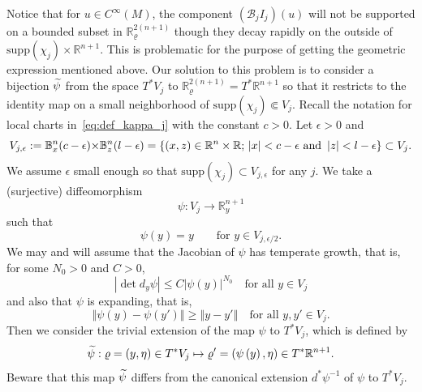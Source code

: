 \documentclass[10pt]{amsart}
\theoremstyle{definition}\newtheorem{defi}[theo]{Definition}\newtheorem{rema}[theo]{Remark}\newtheorem{exam}[theo]{Example}\newtheorem{exem}[theo]{Example}\newtheorem{nota}[theo]{Notation}
\newcommand{\clB}{\mathcal{B}}
\newcommand{\supp}{\mathrm{supp}}
\newcommand{\bbR}{\mathbb{R}}
\newcommand{\bbB}{\mathbb{B}}
\let\oldtilde\tilde
\renewcommand*{\tilde}[1]{\mathchoice{\widetilde{#1}}{\widetilde{#1}}{\oldtilde{#1}}{\oldtilde{#1}}}
\begin{document}
Notice that for $u\in C^{\infty}(M)$, the component $(\clB_{j}I_{j})(u)$ will not be supported on a bounded subset in $\bbR_{\varrho}^{2(n+1)}$ though they decay rapidly on the outside of $\supp(\chi_{j})\times\bbR^{n+1}$. This is problematic for the purpose of getting the geometric expression mentioned above. Our solution to this problem is to consider a bijection $\tilde{\psi}$ from the space $T^{*}V_{j}$ to $\bbR_{\varrho}^{2(n+1)}=T^{*}\bbR^{n+1}$ so that it restricts to the identity map on a small neighborhood of $\supp(\chi_{j})\Subset V_{j}$. Recall the notation for local charts in~\eqref{eq:def_kappa_j} with the constant $c>0$. Let $\epsilon>0$ and
\[
V_{j,\epsilon}:=\text{\ensuremath{\bbB_{x}^{n}(c-\epsilon)}\ensuremath{\times}}\ensuremath{\bbB_{z}^{n}(l-\epsilon)}=\left\{ \left(x,z\right)\in\bbR^{n}\times\bbR;\,\left|x\right|<c-\epsilon\text{ and }\left|z\right|<l-\epsilon\right\} \subset V_{j}.
\]
We assume $\epsilon$ small enough so that $\supp(\chi_{j})\subset V_{j,\epsilon}$ for any $j$. We take a (surjective) diffeomorphism
\begin{equation}\label{eq:def_psi}
\psi:V_{j}\rightarrow\bbR_{y}^{n+1}
\end{equation}
such that
\begin{equation}\label{eq:psi_y_y}
\psi\left(y\right)=y\qquad\text{for }y\in V_{j,\epsilon/2}.
\end{equation}
We may and will assume that the Jacobian of $\psi$ has temperate growth, that is, for some $N_{0}>0$ and $C>0$,
\[
\left|\det d_{y}\psi\right|\leq C\left|\psi\left(y\right)\right|^{N_{0}}\quad\text{for all }y\in V_{j}
\]
and also that $\psi$ is expanding, that is,
\begin{equation}\label{eq:expand}
\left\Vert \psi\left(y\right)-\psi\left(y'\right)\right\Vert \geq\left\Vert y-y'\right\Vert \quad\text{for all }y,y'\in V_{j}.
\end{equation}
Then we consider the trivial extension of the map $\psi$ to $T^{*}V_{j}$, which is defined by
\begin{equation}\label{eq:def_psi_tilde}
\tilde{\psi}:\varrho=\left(y,\eta\right)\in T^{*}V_{j}\mapsto\varrho'=\left(\psi\left(y\right),\eta\right)\in T^{*}\bbR^{n+1}.
\end{equation}
Beware that this map $\tilde{\psi}$ differs from the canonical extension $d^{*}\psi^{-1}$ of $\psi$ to $T^{*}V_{j}$.
\vspace*{-6pt}
\end{document}
